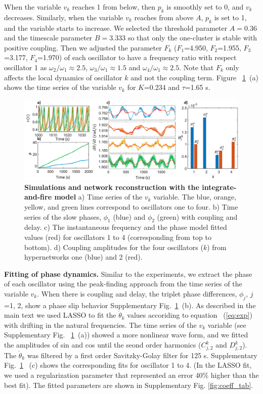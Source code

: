 \documentclass[12pt]{article}
\theoremstyle{plain}
\theoremstyle{definition}
\theoremstyle{remark}
\theoremstyle{remark}
\begin{document}
{When the variable $v_k$ reaches 1 from below, then $p_k$ is smoothly set to 0, and $v_k$ decreases. 
Similarly, when the variable $v_k$ reaches from above $A$, $p_k$ is set to 1, and the variable starts to increase.
We selected the threshold parameter $A=0.36$ and the timescale parameter $B=3.333$ so that only the one-cluster
 is stable with positive coupling. 
 Then we adjusted the parameter $F_k$ ($F_1$=4.950, $F_2$=1.955, $F_3$=3.177, $F_4$=1.970) of each oscillator to have a frequency ratio with respect oscillator 1 as $\omega_2/\omega_1 \approx 2.5$, $\omega_3/\omega_1 \approx 1.5$  and $\omega_4/\omega_1$$\approx 2.5$. Note that $F_k$ only affects the local dynamics of oscillator $k$ and not the coupling term. Figure ~\ref{fig:sim_iaf}~(a) shows the time series of the variable $v_k$ for $K$=0.234 and $\tau$=1.65 s. 
\\
\begin{figure}[!ht]
    \centering
    \includegraphics[width=1\columnwidth]{Slide3_v1.png}
    \caption{{\bf Simulations and network reconstruction with the integrate-and-fire model}  a) Time series of the $v_k$ variable. The blue, orange, yellow, and green lines correspond to oscillators one to four.  b) Time series of the slow phases, $\phi_1$ (blue) and $\phi_2$ (green) with coupling and delay. c) The instantaneous frequency and the 
    phase model fitted values (red) for oscillators 1 to 4 (corresponding from top to bottom). d) Coupling amplitudes for the four oscillators ($k$) from hypernetworks one (blue) and 2 (red).}
    \label{fig:sim_iaf}
\end{figure}

\textbf{Fitting of phase dynamics.} Similar to the experiments, we extract the phase of each oscillator using the peak-finding approach \cite{pikovsky2003synchronization} from the time series of the variable $v_k$. When there is coupling and delay, the triplet phase differences,  $\phi_j$, $j$=1, 2, show a phase slip behavior Supplementary Fig.~\ref{fig:sim_iaf}~(b). As described in the main text we used LASSO to fit the $\dot{\theta}_k$ values accoriding to equation ~(\ref{eq:exp}) with drifting in the natural frequencies. The time series of the $v_k$ variable (see Supplementary Fig. ~\ref{fig:sim_iaf}~(a)) showed a more nonlinear wave form, and we fitted the amplitudes of  sin and cos until the seond order harmonics ($C_{j,2}^k$ and $D_{j, 2}^k$). The $\dot{\theta}_k$ was filtered by a first order Savitzky-Golay filter for 125 s. Supplementary Fig.~\ref{fig:sim_iaf} ~(c) shows the corresponding fits for oscillator 1 to 4. (In the LASSO 
fit,  we used a regularization parameter that represented an error 40\% higher than the best fit). The fitted parameters are shown in Supplementary Fig. \ref{fig:coeff_tab}. 

}
\end{document}

